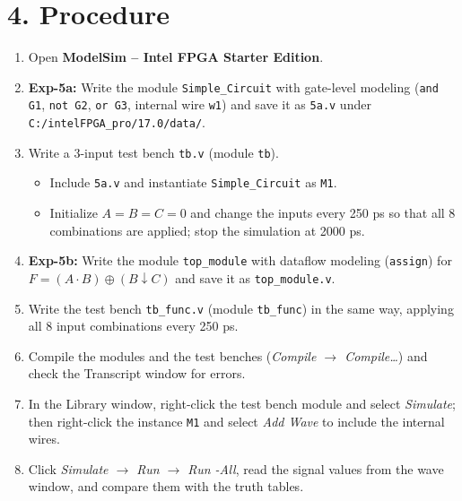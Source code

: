 \section*{4. Procedure}
\begin{enumerate}[leftmargin=*]
    \item Open \textbf{ModelSim -- Intel FPGA Starter Edition}.
    \item \textbf{Exp-5a:} Write the module \texttt{Simple\_Circuit} with gate-level modeling (\texttt{and G1}, \texttt{not G2}, \texttt{or G3}, internal wire \texttt{w1}) and save it as \texttt{5a.v} under \texttt{C:/intelFPGA\_pro/17.0/data/}.
    \item Write a 3-input test bench \texttt{tb.v} (module \texttt{tb}).
    \begin{itemize}
        \item Include \texttt{5a.v} and instantiate \texttt{Simple\_Circuit} as \texttt{M1}.
        \item Initialize $A=B=C=0$ and change the inputs every 250 ps so that all 8 combinations are applied; stop the simulation at 2000 ps.
    \end{itemize}
    \item \textbf{Exp-5b:} Write the module \texttt{top\_module} with dataflow modeling (\texttt{assign}) for $F = (A \cdot B) \oplus (B \downarrow C)$ and save it as \texttt{top\_module.v}.
    \item Write the test bench \texttt{tb\_func.v} (module \texttt{tb\_func}) in the same way, applying all 8 input combinations every 250 ps.
    \item Compile the modules and the test benches (\textit{Compile $\rightarrow$ Compile\ldots}) and check the Transcript window for errors.
    \item In the Library window, right-click the test bench module and select \textit{Simulate}; then right-click the instance \texttt{M1} and select \textit{Add Wave} to include the internal wires.
    \item Click \textit{Simulate $\rightarrow$ Run $\rightarrow$ Run -All}, read the signal values from the wave window, and compare them with the truth tables.
\end{enumerate}

\newpage
